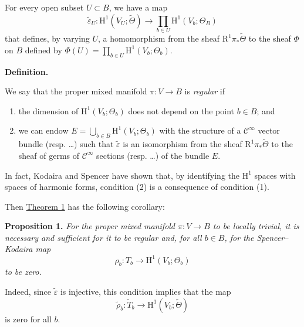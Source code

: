 \documentclass[british]{article}
\providecommand{\tightlist}{%
\setlength{\itemsep}{0pt}\setlength{\parskip}{0pt}}
\newenvironment{itenv}[1]
  {\phantomsection\par\smallskip\noindent\textbf{#1.}\itshape}
  {\par\smallskip}
\newenvironment{rmenv}[1]
  {\phantomsection\par\smallskip\noindent\textbf{#1.}\rmfamily}
  {\par\smallskip}
\newcommand{\oldpage}[1]{\marginpar{\footnotesize$\Big\vert$ \textit{p.~#1}}}
\begin{document}
For every open subset \(U\subset B\), we have a map \[
  \widetilde{\varepsilon}_U\colon \mathrm{H}^1(V_U;\widetilde{\Theta}) \to \prod_{b\in U}\mathrm{H}^1(V_b;\Theta_B)
\] that defines, by varying \(U\), a homomorphism from the sheaf
\(\mathrm{R}^1\pi_*\widetilde{\Theta}\) to the sheaf \(\Phi\) on \(B\)
defined by \(\Phi(U)=\prod_{b\in U}\mathrm{H}^1(V_b;\Theta_b)\).

\protect{}\label{three-definition}
\begin{rmenv}{Definition}

We say that the proper mixed manifold \(\pi\colon V\to B\) is
\emph{regular} if

\begin{enumerate}
\def\labelenumi{\arabic{enumi}.}
\tightlist
\item
  the dimension of \(\mathrm{H}^1(V_b;\Theta_b)\) does not depend on the
  point \(b\in B\); and
\item
  we can endow \(E=\bigcup_{b\in B}\mathrm{H}^1(V_b;\Theta_b)\) with the
  structure of a \(\mathscr{C}^\infty\) vector bundle (resp. \ldots)
  such that \(\widetilde{\varepsilon}\) is an isomorphism from the sheaf
  \(\mathrm{R}^1\pi_*\widetilde{\Theta}\) to the sheaf of germs of
  \(\mathscr{C}^\infty\) sections (resp. \ldots) of the bundle \(E\).
\end{enumerate}

\end{rmenv}

In fact, Kodaira and Spencer have shown \autocite{3-2} that, by
identifying the \(\mathrm{H}^1\) spaces with spaces of harmonic forms,
condition (2) is a consequence of condition (1).

Then \hyperref[three-theorem-1]{Theorem 1} has the following corollary:

\protect{}\label{three-proposition-1}
\begin{itenv}{Proposition 1}
For the proper mixed manifold \(\pi\colon V\to B\) to be locally
trivial, it is necessary and sufficient for it to be regular and, for
all \(b\in B\), for the Spencer--Kodaira map \[
  \rho_b\colon T_b \to \mathrm{H}^1(V_b;\Theta_b)
\] to be zero.

\end{itenv}

Indeed, since \(\widetilde{\varepsilon}\) is injective, this condition
implies that the map \[
  \widetilde{\rho}_b\colon \widetilde{T}_b \to \mathrm{H}^1(V_b;\widetilde{\Theta})
\] is zero for all \(b\). \oldpage{3-04}
\end{document}
